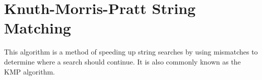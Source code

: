 \section{Knuth-Morris-Pratt String Matching}
This algorithm is a method of speeding up string searches by using mismatches to determine where a search should continue.
It is also commonly known as the KMP algorithm.
